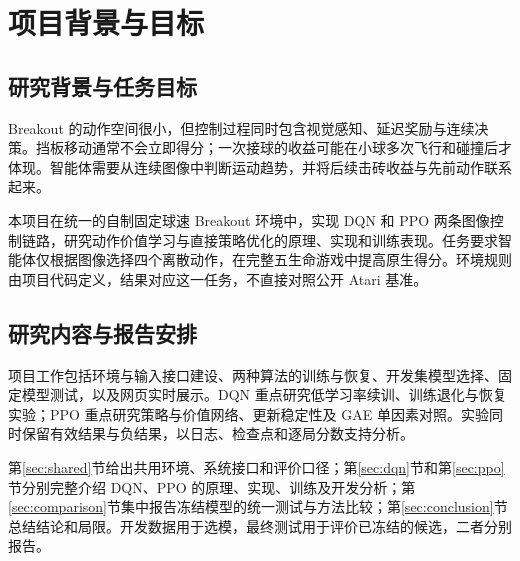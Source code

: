 \section{项目背景与目标}
\label{sec:introduction}
\subsection{研究背景与任务目标}
Breakout 的动作空间很小，但控制过程同时包含视觉感知、延迟奖励与连续决策。挡板移动通常不会立即得分；一次接球的收益可能在小球多次飞行和碰撞后才体现。智能体需要从连续图像中判断运动趋势，并将后续击砖收益与先前动作联系起来。

本项目在统一的自制固定球速 Breakout 环境中，实现 DQN 和 PPO 两条图像控制链路，研究动作价值学习与直接策略优化的原理、实现和训练表现。任务要求智能体仅根据图像选择四个离散动作，在完整五生命游戏中提高原生得分。环境规则由项目代码定义，结果对应这一任务，不直接对照公开 Atari 基准。

\subsection{研究内容与报告安排}
项目工作包括环境与输入接口建设、两种算法的训练与恢复、开发集模型选择、固定模型测试，以及网页实时展示。DQN 重点研究低学习率续训、训练退化与恢复实验；PPO 重点研究策略与价值网络、更新稳定性及 GAE 单因素对照。实验同时保留有效结果与负结果，以日志、检查点和逐局分数支持分析。

第\ref{sec:shared}节给出共用环境、系统接口和评价口径；第\ref{sec:dqn}节和第\ref{sec:ppo}节分别完整介绍 DQN、PPO 的原理、实现、训练及开发分析；第\ref{sec:comparison}节集中报告冻结模型的统一测试与方法比较；第\ref{sec:conclusion}节总结结论和局限。开发数据用于选模，最终测试用于评价已冻结的候选，二者分别报告。

\FloatBarrier
